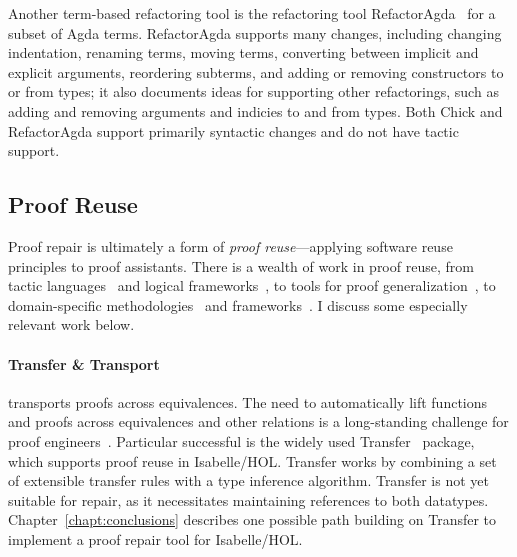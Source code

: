 Another term-based refactoring tool is the refactoring tool RefactorAgda~\cite{wibergh2019} for a subset of Agda terms.
RefactorAgda supports many changes, including changing indentation, renaming terms, moving terms, converting between implicit and
explicit arguments, reordering subterms, and adding or removing constructors to or from types; 
it also documents ideas for supporting other refactorings, such as adding and removing arguments and indicies to and from types.
Both Chick and RefactorAgda support primarily syntactic changes and do not have tactic support.

\subsection{Proof Reuse}
\label{sec:reuse}

Proof repair is ultimately a form of \textit{proof reuse}---applying software reuse principles to proof assistants.
There is a wealth of work in proof reuse, from tactic languages~\cite{Felty1994} and logical frameworks~\cite{caplan1995logical},
to tools for proof generalization~\cite{pons2000generalization, johnsen2004theorem},
to domain-specific methodologies~\cite{Delaware:2011:PLT:2048066.2048113} and frameworks~\cite{Delaware:2013:MLC:2429069.2429094}.
I discuss some especially relevant work below. %


\paragraph{Transfer \& Transport}
\toolnamec transports proofs across equivalences.
The need to automatically lift functions and proofs across equivalences and other relations is a long-standing challenge for proof 
engineers~\cite{magaud2000changing, Barthe2001, magaud2003changing}.
Particular successful is the widely used Transfer~\cite{Huffman2013} package, which supports proof reuse in Isabelle/HOL. %
Transfer works by combining a set of extensible transfer rules with a type inference algorithm.
Transfer is not yet suitable for repair, as it necessitates maintaining references to both datatypes.
Chapter~\ref{chapt:conclusions} describes one possible path building on Transfer to implement a proof repair tool for Isabelle/HOL.

